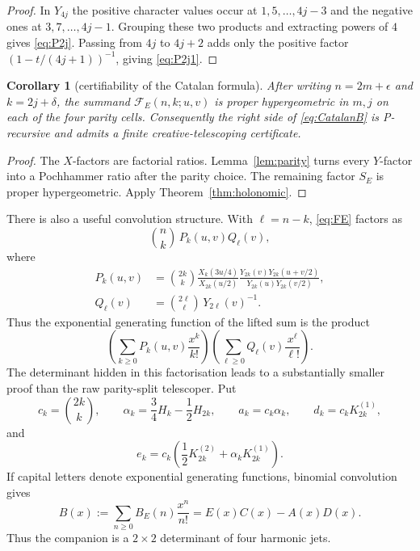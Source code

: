\documentclass[11pt]{article}
\newtheorem{corollary}[theorem]{Corollary}
\theoremstyle{definition}
\theoremstyle{remark}
\begin{document}
\begin{proof}
In $Y_{4j}$ the positive character values occur at $1,5,\ldots,4j-3$ and the negative
ones at $3,7,\ldots,4j-1$.  Grouping these two products and extracting powers of $4$
gives \eqref{eq:P2j}.  Passing from $4j$ to $4j+2$ adds only the positive factor
$(1-t/(4j+1))^{-1}$, giving \eqref{eq:P2j1}.
\end{proof}

\begin{corollary}[certifiability of the Catalan formula]\label{cor:certCatalan}
After writing $n=2m+\epsilon$ and $k=2j+\delta$, the summand
$\mathcal F_E(n,k;u,v)$ is proper hypergeometric in $m,j$ on each of the four parity
cells.  Consequently the right side of \eqref{eq:CatalanB} is P-recursive and admits a
finite creative-telescoping certificate.
\end{corollary}

\begin{proof}
The $X$-factors are factorial ratios.  Lemma~\ref{lem:parity} turns every $Y$-factor into
a Pochhammer ratio after the parity choice.  The remaining factor $S_E$ is proper
hypergeometric.  Apply Theorem~\ref{thm:holonomic}.
\end{proof}

There is also a useful convolution structure.  With $\ell=n-k$, \eqref{eq:FE} factors as
\[
 \binom nk\,P_k(u,v)Q_\ell(v),
\]
where
\begin{align*}
 P_k(u,v)&=\binom{2k}k\frac{X_k(3u/4)}{X_{2k}(u/2)}
 \frac{Y_{2k}(v)Y_{2k}(u+v/2)}{Y_{2k}(u)Y_{2k}(v/2)},\\
 Q_\ell(v)&=\binom{2\ell}\ell\,Y_{2\ell}(v)^{-1}.
\end{align*}
Thus the exponential generating function of the lifted sum is the product
\begin{equation}\label{eq:EGFfactor}
 \left(\sum_{k\ge0}P_k(u,v)\frac{x^k}{k!}\right)
 \left(\sum_{\ell\ge0}Q_\ell(v)\frac{x^\ell}{\ell!}\right).
\end{equation}
The determinant hidden in this factorisation leads to a substantially smaller proof than
the raw parity-split telescoper.  Put
\begin{equation}\label{eq:cadef}
 c_k=\binom{2k}{k},\qquad
 \alpha_k=\frac34H_k-\frac12H_{2k},\qquad
 a_k=c_k\alpha_k,\qquad d_k=c_kK_{2k}^{(1)},
\end{equation}
and
\begin{equation}\label{eq:edef}
 e_k=c_k\left(\frac12K_{2k}^{(2)}+\alpha_kK_{2k}^{(1)}\right).
\end{equation}
If capital letters denote exponential generating functions, binomial convolution gives
\begin{equation}\label{eq:Bdet}
 B(x):=\sum_{n\ge0}B_E(n)\frac{x^n}{n!}=E(x)C(x)-A(x)D(x).
\end{equation}
Thus the companion is a $2\times2$ determinant of four harmonic jets.
\end{document}
